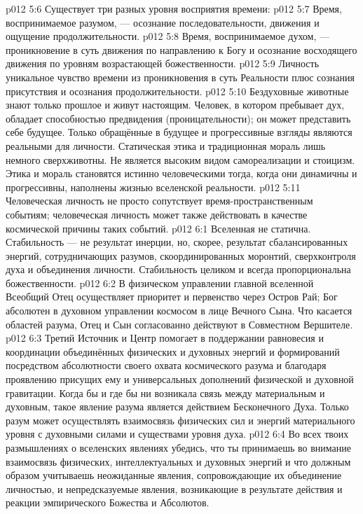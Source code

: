 \vs p012 5:6 \pc Существует три разных уровня восприятия времени:
\vs p012 5:7 Время, воспринимаемое разумом, --- осознание последовательности, движения и ощущение продолжительности.
\vs p012 5:8 Время, воспринимаемое духом, --- проникновение в суть движения по направлению к Богу и осознание восходящего движения по уровням возрастающей божественности.
\vs p012 5:9 Личность  уникальное чувство времени из проникновения в суть Реальности плюс сознания присутствия и осознания продолжительности.
\vs p012 5:10 \pc Бездуховные животные знают только прошлое и живут настоящим. Человек, в котором пребывает дух, обладает способностью предвидения (проницательности); он может представить себе будущее. Только обращённые в будущее и прогрессивные взгляды являются реальными для личности. Статическая этика и традиционная мораль лишь немного сверхживотны. Не является высоким видом самореализации и стоицизм. Этика и мораль становятся истинно человеческими тогда, когда они динамичны и прогрессивны, наполнены жизнью вселенской реальности.
\vs p012 5:11 Человеческая личность не просто сопутствует время\hyp{}пространственным событиям; человеческая личность может также действовать в качестве космической причины таких событий.
\vs p012 6:1 Вселенная не статична. Стабильность --- не результат инерции, но, скорее, результат сбалансированных энергий, сотрудничающих разумов, скоординированных моронтий, сверхконтроля духа и объединения личности. Стабильность целиком и всегда пропорциональна божественности.
\vs p012 6:2 В физическом управлении главной вселенной Всеобщий Отец осуществляет приоритет и первенство через Остров Рай; Бог абсолютен в духовном управлении космосом в лице Вечного Сына. Что касается областей разума, Отец и Сын согласованно действуют в Совместном Вершителе.
\vs p012 6:3 Третий Источник и Центр помогает в поддержании равновесия и координации объединённых физических и духовных энергий и формирований посредством абсолютности своего охвата космического разума и благодаря проявлению присущих ему и универсальных дополнений физической и духовной гравитации. Когда бы и где бы ни возникала связь между материальным и духовным, такое явление разума является действием Бесконечного Духа. Только разум может осуществлять взаимосвязь физических сил и энергий материального уровня с духовными силами и существами уровня духа.
\vs p012 6:4 Во всех твоих размышлениях о вселенских явлениях убедись, что ты принимаешь во внимание взаимосвязь физических, интеллектуальных и духовных энергий и что должным образом учитываешь неожиданные явления, сопровождающие их объединение личностью, и непредсказуемые явления, возникающие в результате действия и реакции эмпирического Божества и Абсолютов.
